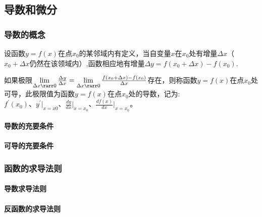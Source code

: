 \documentclass[
]{article}
\begin{document}
\hypertarget{ux5bfcux6570ux548cux5faeux5206}{%
\subsection{导数和微分}\label{ux5bfcux6570ux548cux5faeux5206}}

\hypertarget{ux5bfcux6570ux7684ux6982ux5ff5}{%
\subsubsection{导数的概念}\label{ux5bfcux6570ux7684ux6982ux5ff5}}

设函数\(y = f(x)\)在点\(x_0\)的某邻域内有定义，当自变量\(x\)在\(x_0\)处有增量\(\Delta x\)（\(x_0+\Delta x\)仍然在该领域内）,函数相应地有增量\(\Delta y=f(x_0+\Delta x)- f(x_0)\).

如果极限\(\lim\limits_{\Delta x \rarr 0} \frac{\Delta y}{\Delta x} = \lim\limits_{\Delta x \rarr 0} \frac{f(x_0+\Delta x)-f(x_0)}{\Delta x}\)存在，则称函数\(y = f(x)\)在点\(x_0\)处可导，此极限值为函数\(y=f(x)\)在点\(x_0\)处的导数，记为:\(f^{'}(x_0)、y^{'}\vert_{x=x0}、\frac{dy}{dx} \vert_{x=x_0}、\frac{df(x)}{dx}\vert_{x=x_0}\)。

\hypertarget{ux5bfcux6570ux7684ux5145ux8981ux6761ux4ef6}{%
\paragraph{导数的充要条件}\label{ux5bfcux6570ux7684ux5145ux8981ux6761ux4ef6}}

\hypertarget{ux53efux5bfcux7684ux5145ux8981ux6761ux4ef6}{%
\paragraph{可导的充要条件}\label{ux53efux5bfcux7684ux5145ux8981ux6761ux4ef6}}

\hypertarget{ux51fdux6570ux7684ux6c42ux5bfcux6cd5ux5219}{%
\subsubsection{函数的求导法则}\label{ux51fdux6570ux7684ux6c42ux5bfcux6cd5ux5219}}

\hypertarget{ux5bfcux6570ux6c42ux5bfcux6cd5ux5219}{%
\paragraph{导数求导法则}\label{ux5bfcux6570ux6c42ux5bfcux6cd5ux5219}}

\hypertarget{ux53cdux51fdux6570ux7684ux6c42ux5bfcux6cd5ux5219}{%
\paragraph{反函数的求导法则}\label{ux53cdux51fdux6570ux7684ux6c42ux5bfcux6cd5ux5219}}
\end{document}
